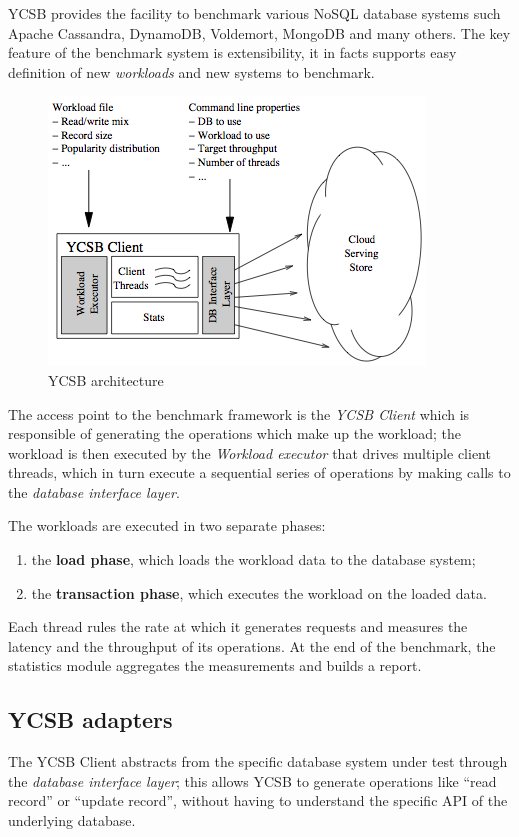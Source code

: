 \noindent YCSB provides the facility to benchmark various NoSQL database systems such Apache Cassandra, DynamoDB, Voldemort, MongoDB and many others.
The key feature of the benchmark system is extensibility, it in facts supports easy definition of new \textit{workloads} and new systems to benchmark.

\begin{figure}[tbh]
  \centering
  \includegraphics[width=10cm]{images/ycsb_architecture}
  \caption{YCSB architecture \cite{paper:ycsb}}
  \label{fig:ycsb-architecture}
\end{figure} 

\newparagraph The access point to the benchmark framework is the \textit{YCSB Client} which is responsible of generating the operations which make up the workload; the workload is then executed by the \textit{Workload executor} that drives multiple client threads, which in turn execute a sequential series of operations by making calls to the \textit{database interface layer}.

\noindent The workloads are executed in two separate phases:
\begin{enumerate}
\item the \textbf{load phase}, which loads the workload data to the database system;
\item the \textbf{transaction phase}, which executes the workload on the loaded data.
\end{enumerate}
\noindent Each thread rules the rate at which it generates requests and measures the latency and the throughput of its operations. At the end of the benchmark, the statistics module aggregates the measurements and builds a report.

\subsection{YCSB adapters}
The YCSB Client abstracts from the specific database system under test through the \textit{database interface layer}; this allows YCSB to generate operations like ``read record'' or ``update record'', without having to understand the specific API of the underlying database.

